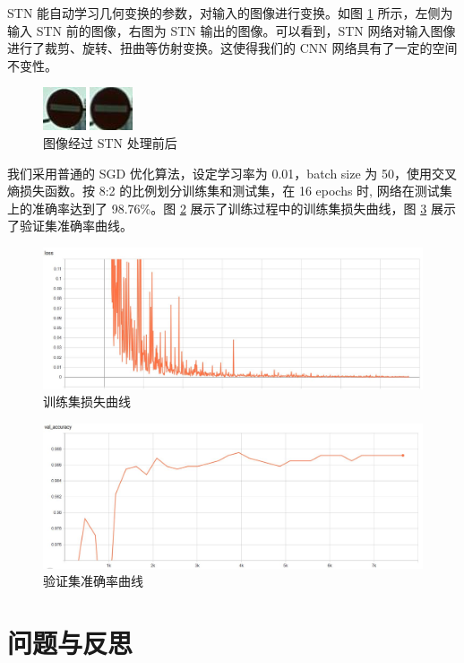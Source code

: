 \documentclass{report}
\begin{document}
STN 能自动学习几何变换的参数，对输入的图像进行变换。如图 \ref{fig:stn_process} 所示，左侧为输入 STN 前的图像，右图为 STN 输出的图像。可以看到，STN 网络对输入图像进行了裁剪、旋转、扭曲等仿射变换。这使得我们的 CNN 网络具有了一定的空间不变性。

\begin{figure}[htbp]
  \centering
  \includegraphics[width = 0.2 \textwidth]{stn-process.png}
  \caption{图像经过 STN 处理前后}
  \label{fig:stn_process}
\end{figure}

我们采用普通的 SGD 优化算法，设定学习率为 0.01，batch size 为 50，使用交叉熵损失函数。按 8:2 的比例划分训练集和测试集，在 16 epochs 时, 网络在测试集上的准确率达到了 98.76\%。图 \ref{fig:cnn-loss} 展示了训练过程中的训练集损失曲线，图 \ref{fig:cnn-accuracy} 展示了验证集准确率曲线。

\begin{figure}[htbp]
  \centering
  \includegraphics[width = 0.9 \textwidth]{cnn-loss.jpg}
  \caption{训练集损失曲线}
  \label{fig:cnn-loss}
\end{figure}

\begin{figure}[htbp]
  \centering
  \includegraphics[width = 0.9 \textwidth]{cnn-val-accuracy.JPG}
  \caption{验证集准确率曲线}
  \label{fig:cnn-accuracy}
\end{figure}


\section{问题与反思}
\end{document}
